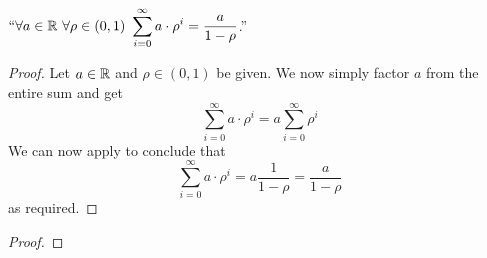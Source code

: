         \begin{corollary}
            $``\forall a \in \mathbb{R} \ \forall \rho \in (0, 1) \
            \displaystyle\sum_{i = 0}^{\infty} a \cdot \rho^i = \dfrac{a}{1 - \rho}$.''
        \end{corollary}
        \begin{proof}
            Let $a \in \mathbb{R}$ and $\rho \in (0, 1)$ be given. We now simply factor
            $a$ from the entire sum and get
            \[
                \sum_{i = 0}^{\infty} a \cdot \rho^i = a \sum_{i = 0}^{\infty} \rho^i
            \]
            We can now apply  to conclude
            that
            \[
                \sum_{i = 0}^{\infty} a \cdot \rho^i = a \frac{1}{1 - \rho} = \frac{a}{1 - \rho}
            \]
            as required. \QED
        \end{proof}
        \begin{theorem}
        \end{theorem}
        \begin{proof}
        \end{proof}
